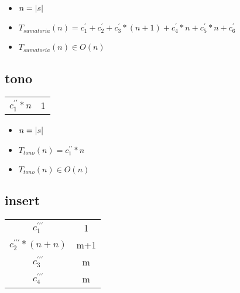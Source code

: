 \documentclass{article}
\begin{document}
    \begin{itemize}
        \item $n = |s|$
        \item $T_{sumatoria}(n) = c^{\prime}_1 + c^{\prime}_2 + c^{\prime}_3 * (n+1) + c^{\prime}_4 * n + c^{\prime}_5 * n + c^{\prime}_6 $
        \item $T_{sumatoria}(n) \in O(n)$
    \end{itemize}

    \subsection*{tono}

    \begin{minipage}{0.70\textwidth}
        
    \end{minipage}
    \hfill
    \begin{minipage}{0.25\textwidth}
        \begin{tabular}{|c|c}

            $c^{\prime\prime}_1 * n$ & 1 \\

        \end{tabular}
    \end{minipage}

    \begin{itemize}
        \item $n = |s|$
        \item $T_{tono}(n) = c^{\prime\prime}_1 * n $
        \item $T_{tono}(n) \in O(n)$
    \end{itemize}

    \subsection*{insert}

    \begin{minipage}{0.70\textwidth}
        
    \end{minipage}
    \hfill
    \begin{minipage}{0.25\textwidth}
        \begin{tabular}{|c|c}
            $c^{\prime\prime\prime}_1$ & 1 \\
            $c^{\prime\prime\prime}_2*(n+n)$ & m+1 \\
            $c^{\prime\prime\prime}_3$ & m \\
            $c^{\prime\prime\prime}_4$ & m \\
        \end{tabular}
    \end{minipage}
\end{document}
